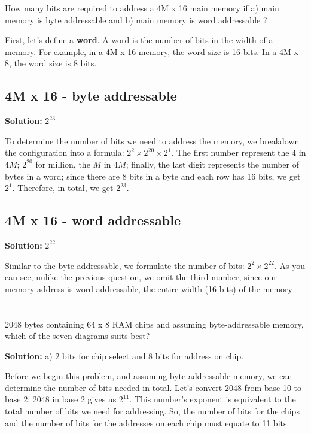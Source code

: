 \documentclass{article}
\begin{document}
How many bits are required to address a 4M x 16 main memory if a) main memory is byte addressable and b) main memory is word addressable ?

First, let's define a \textbf{word}.  A word is the number of bits in the width of a memory. For example, in a 4M x 16 memory, the word size is 16 bits. In a 4M x 8, the word size is 8 bits.

\subsection{4M x 16 - byte addressable}

\textbf{Solution:} $2^{23}$

To determine the number of bits we need to address the memory, we breakdown the configuration into a formula: $2^{2} \times 2^{20} \times 2^1$. The first number represent the $4$ in $4M$; $2^{20}$ for million, the $M$ in $4M$; finally, the last digit represents the number of bytes in a word; since there are 8 bits in a byte and each row has 16 bits, we get $2^1$. Therefore, in total, we get $2^{23}$.

\subsection{4M x 16 - word addressable}

\textbf{Solution:} $2^{22}$

Similar to the byte addressable, we formulate the number of bits: $2^2 \times 2^22$. As you can see, unlike the previous question, we omit the third number, since our memory address is word addressable, the entire width (16 bits) of the memory

\setcounter{section}{9}

\section{}

2048 bytes containing 64 x 8 RAM chips and assuming byte-addressable memory, which of the seven diagrams suits best?

\textbf{Solution: } a)  2 bits for chip select and 8 bits for address on chip.

Before we begin this problem, and assuming byte-addressable memory, we can determine the number of bits needed in total.  Let's convert 2048 from base 10 to base 2; 2048 in base 2 gives us $2^11$.  This number's exponent is equivalent to the total number of bits we need for addressing.  So, the number of bits for the chips and the number of bits for the addresses on each chip must equate to 11 bits.
\end{document}
